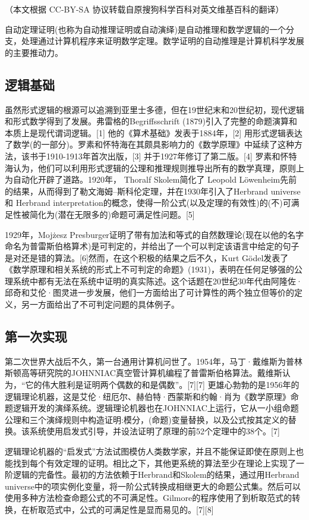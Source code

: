 
（本文根据 CC-BY-SA 协议转载自原搜狗科学百科对英文维基百科的翻译）

自动定理证明(也称为自动推理证明或自动演绎)是自动推理和数学逻辑的一个分支，处理通过计算机程序来证明数学定理。数学证明的自动推理是计算机科学发展的主要推动力。

\subsection{逻辑基础}
虽然形式逻辑的根源可以追溯到亚里士多德，但在19世纪末和20世纪初，现代逻辑和形式数学得到了发展。弗雷格的Begriffsschrift (1879)引入了完整的命题演算和本质上是现代谓词逻辑。[1] 他的《算术基础》发表于1884年，[2] 用形式逻辑表达了数学(的一部分)。罗素和怀特海在其颇具影响力的《数学原理》中延续了这种方法，该书于1910-1913年首次出版，[3] 并于1927年修订了第二版。[4] 罗素和怀特海认为，他们可以利用形式逻辑的公理和推理规则推导出所有的数学真理，原则上为自动化开辟了道路。1920年， Thoralf Skolem简化了 Leopold Löwenheim先前的结果，从而得到了勒文海姆–斯科伦定理，并在1930年引入了Herbrand universe 和 Herbrand interpretation的概念，使得一阶公式(以及定理的有效性)的(不)可满足性被简化为(潜在无限多的)命题可满足性问题。[5]

1929年，Mojżesz Presburger证明了带有加法和等式的自然数理论(现在以他的名字命名为普雷斯伯格算术)是可判定的，并给出了一个可以判定该语言中给定的句子是对还是错的算法。[6]然而，在这个积极的结果之后不久，Kurt Gödel发表了《数学原理和相关系统的形式上不可判定的命题》(1931)，表明在任何足够强的公理系统中都有无法在系统中证明的真实陈述。这个话题在20世纪30年代由阿隆佐·邱奇和艾伦·图灵进一步发展，他们一方面给出了可计算性的两个独立但等价的定义，另一方面给出了不可判定问题的具体例子。

\subsection{第一次实现}
第二次世界大战后不久，第一台通用计算机问世了。1954年，马丁·戴维斯为普林斯顿高等研究院的JOHNNIAC真空管计算机编程了普雷斯伯格算法。戴维斯认为，“它的伟大胜利是证明两个偶数的和是偶数”。[7][7] 更雄心勃勃的是1956年的逻辑理论机器，这是艾伦·纽厄尔、赫伯特·西蒙斯和约翰·肖为《数学原理》命题逻辑开发的演绎系统。逻辑理论机器也在JOHNNIAC上运行，它从一小组命题公理和三个演绎规则中构造证明:模分，(命题)变量替换，以及公式按其定义的替换。该系统使用启发式引导，并设法证明了原理的前52个定理中的38个。[7]

逻辑理论机器的“启发式”方法试图模仿人类数学家，并且不能保证即使在原则上也能找到每个有效定理的证明。相比之下，其他更系统的算法至少在理论上实现了一阶逻辑的完备性。最初的方法依赖于Herbrand和Skolem的结果，通过用Herbrand universe中的项实例化变量，将一阶公式转换成相继更大的命题公式集。然后可以使用多种方法检查命题公式的不可满足性。Gilmore的程序使用了到析取范式的转换，在析取范式中，公式的可满足性是显而易见的。[7][8]

